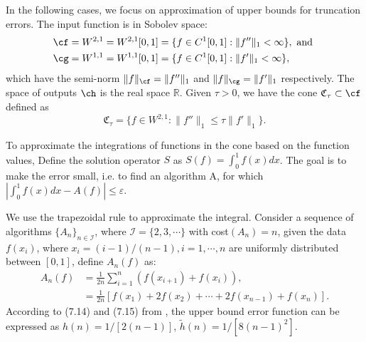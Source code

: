 
\newcommand{\R}{\mathbb{R}}
In the following cases, we focus on approximation of upper bounds for truncation errors. The input function is in Sobolev space:
\begin{align*}
  \cf&=W^{2,1}=W^{2,1}[0,1]=\{f\in C^1[0,1]: \|f''\|_1<\infty\}, \text{ and }\\
  \cg&=W^{1,1}=W^{1,1}[0,1]=\{f\in C^1[0,1]: \|f'\|_1<\infty\},
\end{align*}
which have the semi-norm $\|f\|_{\cf}=\|f''\|_{1}$ and $\|f\|_{\cg}=\|f'\|_{1}$ respectively. The space of outputs $\ch$ is the real space $\R$. Given $\tau > 0$, we have the cone $\mathfrak{C}_{\tau} \subset \cf$ defined as $$\mathfrak{C}_{\tau}=\{f\in W^{2,1}:\|f''\|_1\leq\tau\|f'\|_1\}.$$

To approximate the integrations of functions in the cone based on the function values, Define the solution operator $S$ as $S(f)=\int_{0}^{1}f(x)dx$. The goal is to make the error small, i.e. to find an algorithm A, for which $|\int_{0}^{1}f(x)dx-A(f)|\leq \varepsilon$.

We use the trapezoidal rule to approximate the integral. Consider a sequence of algorithms $\{A_n\}_{n\in \mathcal{I}}$, where $\mathcal{I}=\{2,3,\cdots\}$ with cost$(A_n)=n$, given the data $f(x_i)$, where $x_i=(i-1)/(n-1), i=1,\cdots,n$ are uniformly distributed between $[0,1]$, define $A_n(f)$ as: \begin{align*}
    A_{n}(f)&=\frac{1}{2n}\sum_{i=1}^{n}(f(x_{i+1})+f(x_i)),\\
    &=\frac{1}{2n}[f(x_1)+2f(x_2)+\cdots+2f(x_{n-1})+f(x_n)].
\end{align*}
According to (7.14) and (7.15) from \cite{BraPet11a}, the upper bound error function can be expressed as $h(n)=1/[2(n-1)]$, $\tilde{h}(n)=1/[8(n-1)^2]$.
%
%
